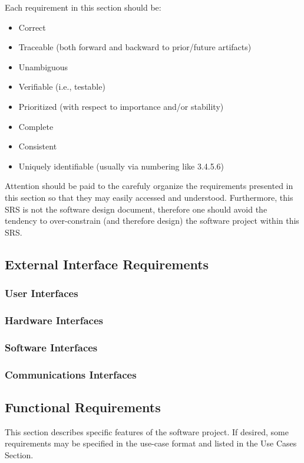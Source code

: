\documentclass[titlepage]{article}
\begin{document}
Each requirement in this section should be:
\begin{itemize}
	\item Correct
	\item Traceable (both forward and backward to prior/future artifacts)
	\item Unambiguous
	\item Verifiable (i.e., testable)
	\item Prioritized (with respect to importance and/or stability)
	\item Complete
	\item Consistent
	\item Uniquely identifiable (usually via numbering like 3.4.5.6)
\end{itemize}

Attention should be paid to the carefuly organize the requirements presented in this section so that they may easily accessed and understood.  Furthermore, this SRS is not the software design document, therefore one should avoid the tendency to over-constrain (and therefore design) the software project within this SRS.

\subsection{External Interface Requirements}

\subsubsection{User Interfaces}

\subsubsection{Hardware Interfaces}

\subsubsection{Software Interfaces}

\subsubsection{Communications Interfaces}

\subsection{Functional Requirements}
This section describes specific features of the software project.  If desired, some requirements may be specified in the use-case format and listed in the Use Cases Section.
\end{document}
